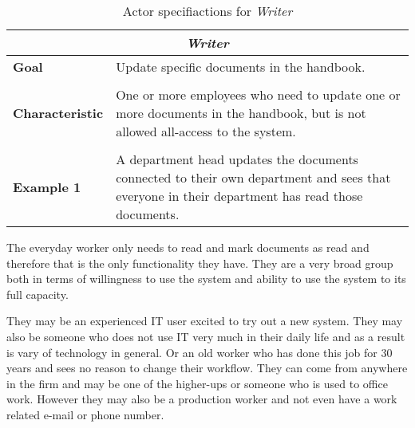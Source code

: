 \begin{table}[H]
	\begin{tabular}{l m{11.3cm}}
		\hline
		\multicolumn{2}{c}{\textbf{\textit{Writer}}}\\
		\hline
		
		\textbf{Goal} & Update specific documents in the handbook. \\
	 	 &  \\
	 	 
		\textbf{Characteristic} &  One or more employees who need to update one or more documents in the handbook, but is not allowed all-access to the system. \\
		 &  \\
		 
		\textbf{Example 1} 
		& A department head updates the documents connected to their own department and sees that everyone in their department has read those documents.\\
		
		\hline
	\end{tabular}
	\caption{Actor specifiactions for \textit{Writer}}\label{tab:Actor-write}
\end{table}

The everyday worker only needs to read and mark documents as read and therefore that is the only functionality they have.
They are a very broad group both in terms of willingness to use the system and ability to use the system to its full capacity.

They may be an experienced IT user excited to try out a new system.
They may also be someone who does not use IT very much in their daily life and as a result is vary of technology in general.
Or an old worker who has done this job for 30 years and sees no reason to change their workflow.
They can come from anywhere in the firm and may be one of the higher-ups or someone who is used to office work.
However they may also be a production worker and not even have a work related e-mail or phone number.

